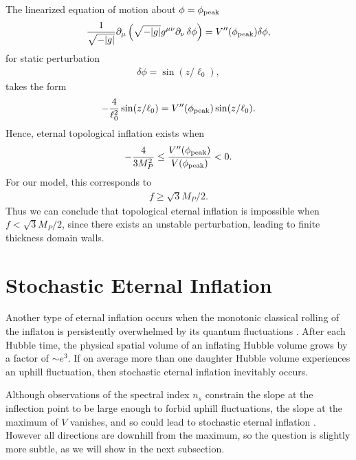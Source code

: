 \documentclass[aps,amsfonts,amsmath,prd,preprint,nofootinbib,superscriptaddress]{revtex4}
\newcommand{\Mp}{{M_{P}}}
\newcommand{\MMp}{{M_P^2}}
\begin{document}
\begin{appendix}
The linearized equation of motion about $\phi = \phi_{\rm peak}$
\begin{align}
\frac{1}{\sqrt{-|g|}}\partial_\mu\left(\sqrt{-|g|}g^{\mu\nu}\partial_\nu\, \delta\phi\right) = V''(\phi_{\rm peak}) \delta\phi,
\end{align}
for static perturbation 
\begin{align}
\delta\phi = \sin(z/\ell_0),
\end{align}
takes the form
\begin{align}
-\frac{4}{\ell_0^2}\sin(z/\ell_0) = V''(\phi_{\rm peak})\sin(z/\ell_0).
\end{align}
Hence, eternal topological inflation exists when
\begin{align}
 -\frac{4}{3\MMp} \leq \frac{V''(\phi_{\rm peak})}{V(\phi_{\rm peak})} < 0.
\end{align}
For our model, this corresponds to
\begin{align}
f \geq \sqrt{3}\Mp/2.
\end{align}
Thus we can conclude that topological eternal inflation is impossible when $f < \sqrt{3}\Mp/2$,
since there exists an unstable perturbation, leading to finite thickness domain walls.




\section{Stochastic Eternal Inflation}\label{sec:stoc}
Another type of eternal inflation occurs when the monotonic classical rolling of the inflaton is persistently overwhelmed by its quantum fluctuations \cite{steinhardt1982,Vilenkin:1983xq,Linde:1983gd}.  
After each Hubble time, the physical spatial volume of an inflating Hubble volume grows by a factor of $\sim e^3$.  If on average more than one daughter Hubble volume
experiences an uphill fluctuation, then stochastic eternal inflation inevitably occurs.


Although observations of the spectral index $n_s$ constrain the slope at the inflection point to be large enough to forbid uphill fluctuations, the slope at the maximum of $V$ vanishes, and so could lead to stochastic eternal inflation \cite{Barenboim:2016mmw}.  
However all directions are downhill from the maximum, so the question is slightly more subtle, as we will show in the next subsection.


\end{appendix}
\end{document}
